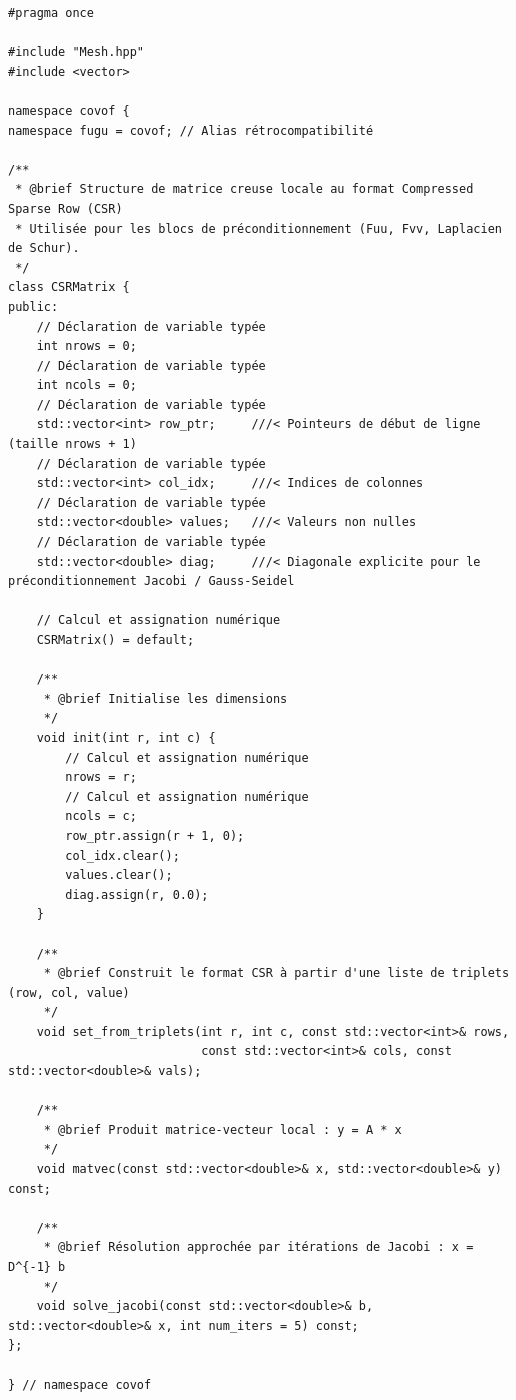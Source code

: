 \documentclass[10pt,a4paper,oneside]{book}
\begin{document}
\begin{lstlisting}[language={[11]C++}]
#pragma once

#include "Mesh.hpp"
#include <vector>

namespace covof {
namespace fugu = covof; // Alias rétrocompatibilité

/**
 * @brief Structure de matrice creuse locale au format Compressed Sparse Row (CSR)
 * Utilisée pour les blocs de préconditionnement (Fuu, Fvv, Laplacien de Schur).
 */
class CSRMatrix {
public:
    // Déclaration de variable typée
    int nrows = 0;
    // Déclaration de variable typée
    int ncols = 0;
    // Déclaration de variable typée
    std::vector<int> row_ptr;     ///< Pointeurs de début de ligne (taille nrows + 1)
    // Déclaration de variable typée
    std::vector<int> col_idx;     ///< Indices de colonnes
    // Déclaration de variable typée
    std::vector<double> values;   ///< Valeurs non nulles
    // Déclaration de variable typée
    std::vector<double> diag;     ///< Diagonale explicite pour le préconditionnement Jacobi / Gauss-Seidel

    // Calcul et assignation numérique
    CSRMatrix() = default;

    /**
     * @brief Initialise les dimensions
     */
    void init(int r, int c) {
        // Calcul et assignation numérique
        nrows = r;
        // Calcul et assignation numérique
        ncols = c;
        row_ptr.assign(r + 1, 0);
        col_idx.clear();
        values.clear();
        diag.assign(r, 0.0);
    }

    /**
     * @brief Construit le format CSR à partir d'une liste de triplets (row, col, value)
     */
    void set_from_triplets(int r, int c, const std::vector<int>& rows,
                           const std::vector<int>& cols, const std::vector<double>& vals);

    /**
     * @brief Produit matrice-vecteur local : y = A * x
     */
    void matvec(const std::vector<double>& x, std::vector<double>& y) const;

    /**
     * @brief Résolution approchée par itérations de Jacobi : x = D^{-1} b
     */
    void solve_jacobi(const std::vector<double>& b, std::vector<double>& x, int num_iters = 5) const;
};

} // namespace covof

\end{lstlisting}
\end{document}
